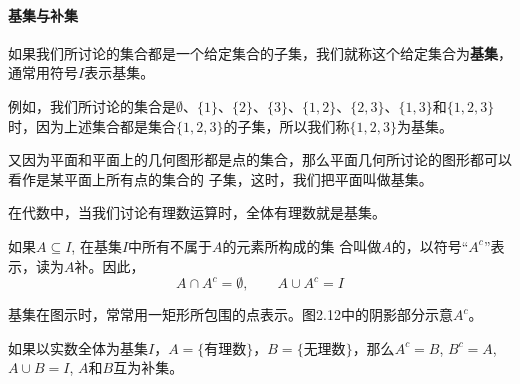 \paragraph{基集与补集}

如果我们所讨论的集合都是一个给定集合的子集，我们就称这个给定集合为\textbf{基集}，通常用符号$I$表示基集。

例如，我们所讨论的集合是$\emptyset$、$\{1\}$、$\{2\}$、$\{3\}$、$\{1, 2\}$、$\{2, 3\}$、$\{1, 3\}$和$\{1, 2, 3\}$时，因为上述集合都是集合$\{1, 2, 3\}$的子集，所以我们称$\{1, 2, 3\}$为基集。

又因为平面和平面上的几何图形都是点的集合，那么平面几何所讨论的图形都可以看作是某平面上所有点的集合的
子集，这时，我们把平面叫做基集。

在代数中，当我们讨论有理数运算时，全体有理数就是基集。

如果$A\subseteq I$, 在基集$I$中所有不属于$A$的元素所构成的集
合叫做$A$的，以符号“$A^c$”表示，读为$A$补。因此，
\[A\cap A^c=\emptyset,\qquad A\cup A^c=I\]

基集在图示时，常常用一矩形所包围的点表示。图2.12中的阴影部分示意$A^c$。

\begin{figure}[htp]\centering
    \begin{minipage}[t]{0.48\textwidth}
    \centering
{}
    \caption{}
    \end{minipage}
    \begin{minipage}[t]{0.48\textwidth}
    \centering
    \caption{}
    \end{minipage}
    \end{figure}

如果以实数全体为基集$I$，$A=\{\text{有理数}\}$，$B=\{\text{无理数}\}$，那么$A^c=B$, $B^c=A$, $A\cup B=I$, $A$和$B$互为补集。

